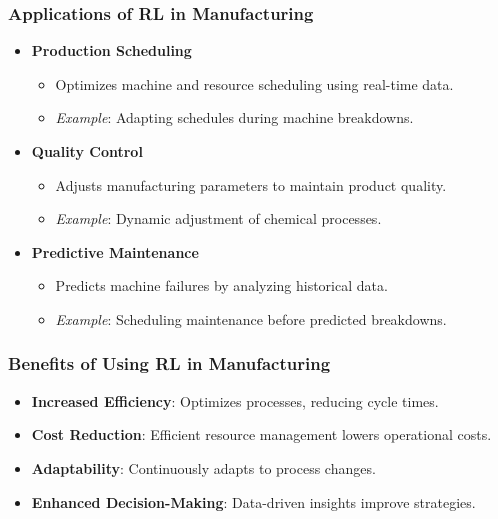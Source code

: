 \documentclass[aspectratio=169]{beamer}
\begin{document}
\begin{frame}
    \frametitle{Applications of RL in Manufacturing}
    \begin{itemize}
        \item \textbf{Production Scheduling}
            \begin{itemize}
                \item Optimizes machine and resource scheduling using real-time data.
                \item \textit{Example}: Adapting schedules during machine breakdowns.
            \end{itemize}
        
        \item \textbf{Quality Control}
            \begin{itemize}
                \item Adjusts manufacturing parameters to maintain product quality.
                \item \textit{Example}: Dynamic adjustment of chemical processes.
            \end{itemize}
        
        \item \textbf{Predictive Maintenance}
            \begin{itemize}
                \item Predicts machine failures by analyzing historical data.
                \item \textit{Example}: Scheduling maintenance before predicted breakdowns.
            \end{itemize}
    \end{itemize}
\end{frame}

\begin{frame}
    \frametitle{Benefits of Using RL in Manufacturing}
    \begin{itemize}
        \item \textbf{Increased Efficiency}: Optimizes processes, reducing cycle times.
        \item \textbf{Cost Reduction}: Efficient resource management lowers operational costs.
        \item \textbf{Adaptability}: Continuously adapts to process changes.
        \item \textbf{Enhanced Decision-Making}: Data-driven insights improve strategies.
    \end{itemize}
\end{frame}
\end{document}
